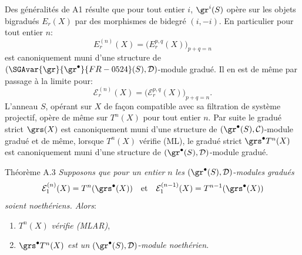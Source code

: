 Des généralités de A1 résulte que pour tout entier \(i\), \(\gr^i(S)\) opère sur les objets bigradués \(E_r(X)\) par des morphismes de bidegré \((i,-i)\). En particulier pour tout entier \(n\):
\[
E_r^{(n)}(X)=\bigl(E_r^{p,q}(X)\bigr)_{p+q=n}
\]
est canoniquement muni d'une structure de \((\SGAvar{\gr}{\gr^\bullet}{FR-0524}(S),\mathcal{D})\)-module gradué. Il en est de même par passage à la limite pour:
\[
\mathcal{E}_r^{(n)}(X)=\bigl(\mathcal{E}_r^{p,q}(X)\bigr)_{p+q=n}.
\]
L'anneau \(S\), opérant sur \(X\) de façon compatible avec sa filtration de système projectif, opère de même sur \(T^n(X)\) pour tout entier \(n\). Par suite le gradué strict \(\grs(X)\) est
canoniquement muni d'une structure de \((\gr^\bullet(S),\mathcal{C})\)-module gradué et de même, lorsque \(T^n(X)\) vérifie (ML), le gradué strict \(\grs^\bullet T^n(X)\) est canoniquement muni d'une structure de \((\gr^\bullet(S),\mathcal{D})\)-module gradué.

\begin{statement}{Théorème A.3}
\emph{Supposons que pour un entier} \(n\) \emph{les} \((\gr^\bullet(S),\mathcal{D})\)-\emph{modules gradués}
\[
\mathcal{E}_1^{(n)}(X)=T^n(\grs^\bullet(X))
\quad\text{et}\quad
\mathcal{E}_1^{(n-1)}(X)=T^{n-1}(\grs^\bullet(X))
\]
\emph{soient noethériens. Alors}:
\begin{enumerate}[label=\textup{(\roman*)}]
\item \(T^n(X)\) \emph{vérifie (MLAR)},
\item \(\grs^\bullet T^n(X)\) \emph{est un} \((\gr^\bullet(S),\mathcal{D})\)-\emph{module noethérien}.
\end{enumerate}
\end{statement}

